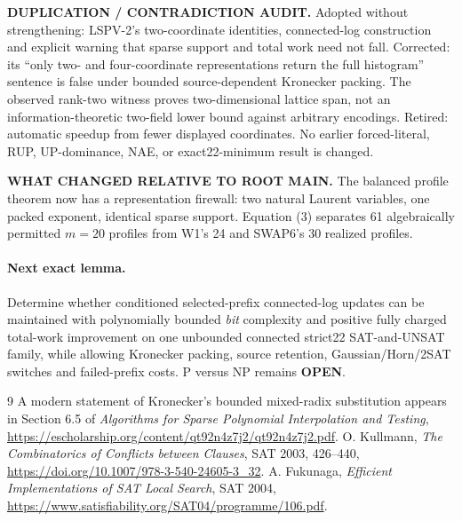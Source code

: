 \documentclass[10pt]{article}
\newcommand{\OPEN}{\textbf{OPEN}}
\begin{document}
\textbf{DUPLICATION / CONTRADICTION AUDIT.}  Adopted without strengthening:
LSPV-2's two-coordinate identities, connected-log construction and explicit
warning that sparse support and total work need not fall.  Corrected: its
``only two- and four-coordinate representations return the full histogram''
sentence is false under bounded source-dependent Kronecker packing.  The
observed rank-two witness proves two-dimensional lattice span, not an
information-theoretic two-field lower bound against arbitrary encodings.
Retired: automatic speedup from fewer displayed coordinates.  No earlier
forced-literal, RUP, UP-dominance, NAE, or exact22-minimum result is changed.

\textbf{WHAT CHANGED RELATIVE TO ROOT MAIN.}  The balanced profile theorem
now has a representation firewall: two natural Laurent variables, one packed
exponent, identical sparse support.  Equation (3) separates 61 algebraically
permitted $m=20$ profiles from W1's 24 and SWAP6's 30 realized profiles.

\paragraph{Next exact lemma.}
Determine whether conditioned selected-prefix connected-log updates can be
maintained with polynomially bounded \emph{bit} complexity and positive
fully charged total-work improvement on one unbounded connected strict22
SAT-and-UNSAT family, while allowing Kronecker packing, source retention,
Gaussian/Horn/2SAT switches and failed-prefix costs.  P versus NP remains
\OPEN.

\begin{thebibliography}{9}
 A modern statement of Kronecker's bounded mixed-radix
substitution appears in Section 6.5 of
\emph{Algorithms for Sparse Polynomial Interpolation and Testing},
\url{https://escholarship.org/content/qt92n4z7j2/qt92n4z7j2.pdf}.
 O. Kullmann, \emph{The Combinatorics of Conflicts between
Clauses}, SAT 2003, 426--440,
\url{https://doi.org/10.1007/978-3-540-24605-3_32}.
 A. Fukunaga, \emph{Efficient Implementations of SAT Local
Search}, SAT 2004,
\url{https://www.satisfiability.org/SAT04/programme/106.pdf}.
\end{thebibliography}
\end{document}
